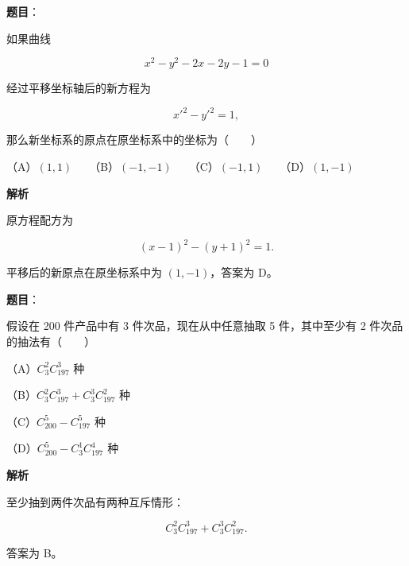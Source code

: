 \begin{answer}

\textbf{题目}：

如果曲线

\nopagebreak[4]
\[
x^2-y^2-2x-2y-1=0
\]

经过平移坐标轴后的新方程为

\nopagebreak[4]
\[
x'^2-y'^2=1,
\]

那么新坐标系的原点在原坐标系中的坐标为\mbox{（　　）}

（A）$(1,1)$　　（B）$(-1,-1)$　　（C）$(-1,1)$　　（D）$(1,-1)$

\textbf{解析}

原方程配方为

\nopagebreak[4]
\[
(x-1)^2-(y+1)^2=1.
\]

平移后的新原点在原坐标系中为 $(1,-1)$，答案为 D。


\end{answer}
\begin{answer}

\textbf{题目}：

假设在 200 件产品中有 3 件次品，现在从中任意抽取 5 件，其中至少有 2 件次品的抽法有\mbox{（　　）}

（A）$C_3^2C_{197}^3$ 种

（B）$C_3^2C_{197}^3+C_3^3C_{197}^2$ 种

（C）$C_{200}^5-C_{197}^5$ 种

（D）$C_{200}^5-C_3^1C_{197}^4$ 种

\textbf{解析}

至少抽到两件次品有两种互斥情形：

\nopagebreak[4]
\[
C_3^2C_{197}^3+C_3^3C_{197}^2.
\]

答案为 B。


\end{answer}
